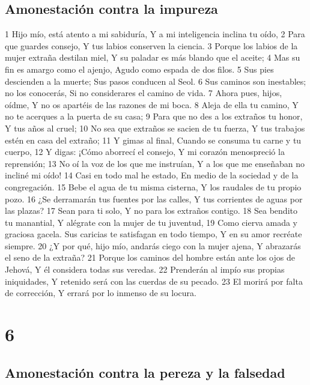 \section*{Amonestación contra la impureza}

1 Hijo mío, está atento a mi sabiduría,
Y a mi inteligencia inclina tu oído,
2 Para que guardes consejo,
Y tus labios conserven la ciencia.
3 Porque los labios de la mujer extraña destilan miel,
Y su paladar es más blando que el aceite;
4 Mas su fin es amargo como el ajenjo,
Agudo como espada de dos filos.
5 Sus pies descienden a la muerte;
Sus pasos conducen al Seol.
6 Sus caminos son inestables; no los conocerás,
Si no considerares el camino de vida.
7 Ahora pues, hijos, oídme,
Y no os apartéis de las razones de mi boca.
8 Aleja de ella tu camino,
Y no te acerques a la puerta de su casa;
9 Para que no des a los extraños tu honor,
Y tus años al cruel;
10 No sea que extraños se sacien de tu fuerza,
Y tus trabajos estén en casa del extraño;
11 Y gimas al final,
Cuando se consuma tu carne y tu cuerpo,
12 Y digas: ¡Cómo aborrecí el consejo,
Y mi corazón menospreció la reprensión;
13 No oí la voz de los que me instruían,
Y a los que me enseñaban no incliné mi oído!
14 Casi en todo mal he estado,
En medio de la sociedad y de la congregación.
15 Bebe el agua de tu misma cisterna,
Y los raudales de tu propio pozo.
16 ¿Se derramarán tus fuentes por las calles,
Y tus corrientes de aguas por las plazas?
17 Sean para ti solo,
Y no para los extraños contigo.
18 Sea bendito tu manantial,
Y alégrate con la mujer de tu juventud,
19 Como cierva amada y graciosa gacela.
Sus caricias te satisfagan en todo tiempo,
Y en su amor recréate siempre.
20 ¿Y por qué, hijo mío, andarás ciego con la mujer ajena,
Y abrazarás el seno de la extraña?
21 Porque los caminos del hombre están ante los ojos de Jehová,
Y él considera todas sus veredas.
22 Prenderán al impío sus propias iniquidades,
Y retenido será con las cuerdas de su pecado.
23 El morirá por falta de corrección,
Y errará por lo inmenso de su locura.

\chapter{6}

\section*{Amonestación contra la pereza y la falsedad}

